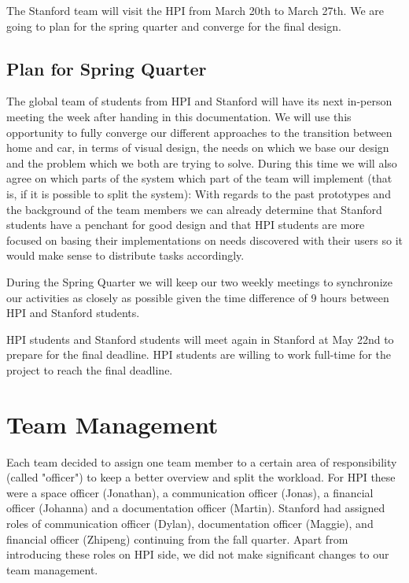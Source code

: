 The Stanford team will visit the HPI from March 20th to March 27th. We are going to plan for the spring quarter and converge for the final design.

\subsection{Plan for Spring Quarter}

The global team of students from HPI and Stanford will have its next in-person meeting the week after handing in this documentation. We will use this opportunity to fully converge our different approaches to the transition between home and car, in terms of visual design, the needs on which we base our design and the problem which we both are trying to solve. During this time we will also agree on which parts of the system which part of the team will implement (that is, if it is possible to split the system): With regards to the past prototypes and the background of the team members we can already determine that Stanford students have a penchant for good design and that HPI students are more focused on basing their implementations on needs discovered with their users so it would make sense to distribute tasks accordingly.

During the Spring Quarter we will keep our two weekly meetings to synchronize our activities as closely as possible given the time difference of 9 hours between HPI and Stanford students.

HPI students and Stanford students will meet again in Stanford at May 22nd to prepare for the final deadline. HPI students are willing to work full-time for the project to reach the final deadline.

\section{Team Management}
Each team decided to assign one team member to a certain area of responsibility (called "officer") to keep a better overview and split the workload. For HPI these were a space officer (Jonathan), a communication officer (Jonas), a financial officer (Johanna) and a documentation officer (Martin). Stanford had assigned roles of communication officer (Dylan), documentation officer (Maggie), and financial officer (Zhipeng) continuing from the fall quarter. Apart from introducing these roles on HPI side, we  did not make significant changes to our team management. 

